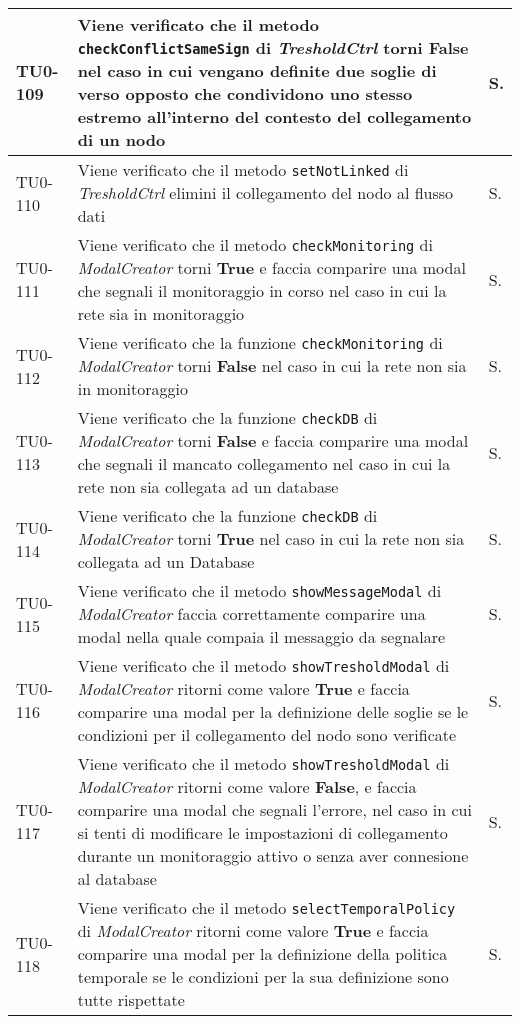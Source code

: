 \begin{longtable}{|C{.15\textwidth}|m{.66\textwidth}|C{.10\textwidth}|}
\hline
{}TU0-109 & Viene verificato che il metodo \texttt{checkConflictSameSign} di \textit{TresholdCtrl} torni \textbf{False} nel caso in cui vengano definite due soglie di verso opposto che condividono uno stesso estremo all'interno del contesto del collegamento di un nodo & S.\\
\hline
TU0-110 & Viene verificato che il metodo \texttt{setNotLinked} di \textit{TresholdCtrl} elimini il collegamento del nodo al flusso dati & S.\\
\hline
{}TU0-111 & Viene verificato che il metodo \texttt{checkMonitoring} di \textit{ModalCreator} torni \textbf{True} e faccia comparire una modal che segnali il monitoraggio in corso nel caso in cui la rete sia in monitoraggio & S. \\
\hline
TU0-112 & Viene verificato che la funzione \texttt{checkMonitoring} di \textit{ModalCreator} torni \textbf{False} nel caso in cui la rete non sia in monitoraggio & S. \\
\hline
{}TU0-113 & Viene verificato che la funzione \texttt{checkDB} di \textit{ModalCreator} torni \textbf{False} e faccia comparire una modal che segnali il mancato collegamento nel caso in cui la rete non sia collegata ad un database & S. \\
\hline
TU0-114 & Viene verificato che la funzione \texttt{checkDB} di \textit{ModalCreator} torni \textbf{True} nel caso in cui la rete non sia collegata ad un Database & S. \\
\hline
{}TU0-115 & Viene verificato che il metodo \texttt{showMessageModal} di \textit{ModalCreator} faccia correttamente comparire una modal nella quale compaia il messaggio da segnalare & S. \\
\hline
TU0-116 & Viene verificato che il metodo \texttt{showTresholdModal} di \textit{ModalCreator} ritorni come valore \textbf{True} e faccia comparire una modal per la definizione delle soglie se le condizioni per il collegamento del nodo sono verificate & S. \\
\hline
{}TU0-117 & Viene verificato che il metodo \texttt{showTresholdModal} di \textit{ModalCreator} ritorni come valore \textbf{False}, e faccia comparire una modal che segnali l'errore, nel caso in cui si tenti di modificare le impostazioni di collegamento durante un monitoraggio attivo o senza aver connesione al database  & S. \\
\hline
TU0-118 & Viene verificato che il metodo \texttt{selectTemporalPolicy} di \textit{ModalCreator} ritorni come valore \textbf{True} e faccia comparire una modal per la definizione della politica temporale se le condizioni per la sua definizione sono tutte rispettate & S. \\

\end{longtable}
